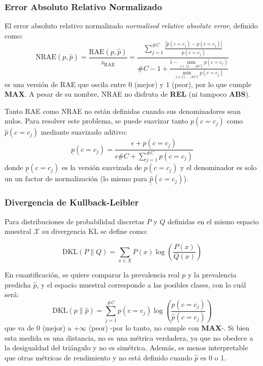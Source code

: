 \subsubsection{Error Absoluto Relativo Normalizado}\label{evaluacion:nrae}

El error absoluto relativo normalizado {\it normalised relative absolute error},
definido como:
\begin{equation}
    {\text{NRAE}(p, \hat p)} = \frac{\text{RAE}(p, \hat p)}{z_{\text{RAE}}} = \frac{\sum \limits_{j=1}^{\#C}{\frac{|\hat p(c=c_j) - p(c=c_j)|}{p(c=c_j)}}}{\#C - 1 + \frac {1 - \displaystyle \min_{j\in\{1,\dots,\#C\}}p(c=c_j)}{\displaystyle \min_{j\in\{1,\dots,\#C\}}p(c=c_j)}}\label{evaluacion:eq_nrae}
\end{equation}
es una versión de RAE que oscila entre 0 (mejor) y 1 (peor), por lo que cumple
{\bf MAX}. A pesar de su nombre, NRAE no disfruta de {\bf REL} (ni tampoco {\bf
ABS}).

Tanto RAE como NRAE no están definidas cuando sus denominadores sean nulos. Para
resolver este problema, se puede suavizar tanto $p(c=c_j)$ como $\hat p(c=c_j)$
mediante suavizado aditivo:
\begin{equation}
    \underline p(c=c_j) = \frac{\epsilon + p(c=c_j)}{\epsilon  \#C + \sum \limits_{j=1}^{\#C}{p(c=c_j)}}\label{evaluacion:eq_suav_rae_nrae}
\end{equation}
donde $\underline p(c=c_j)$ es la versión suavizada de $p(c=c_j)$ y el
denominador es solo un un factor de normalización (lo mismo para $\underline
{\hat p}(c=c_j)$).

\subsubsection{Divergencia de Kullback-Leibler}\label{evaluacion:dkl}

Para distribuciones de probabilidad discretas $P$ y $Q$ definidas en el mismo
espacio muestral ${\mathcal {X}}$ su divergencia KL se define como:

\begin{equation}
    {\text{DKL}}(P\parallel Q)=\sum \limits_{x\in {X}}P(x)\log \left({\frac {P(x)}{Q(x)}}\right)\label{evaluacion:eq_dkl}
\end{equation}

En cuantificación, se quiere comparar la prevalencia real $p$ y la prevalencia
predicha $\hat{p}$, y el espacio muestral corresponde a las posibles clases, con
lo cuál será:
\begin{equation}
    {\text{DKL}}(p\parallel \hat{p}) = \sum \limits_{j=1}^{\#C}p(c=c_j)\log \left({\frac {p(c=c_j)}{\hat p(c=c_j)}}\right)\label{evaluacion:eq_dkl2}
\end{equation}
que va de {0} (mejor) a {+$\infty$} (peor) -por lo tanto, no cumple con {\bf
MAX}-. Si bien esta medida es una distancia, no es una métrica verdadera, ya que
no obedece a la desigualdad del triángulo y no es simétrica. Además, es menos
interpretable que otras métricas de rendimiento y no está definido cuando
$\hat{p}$ es 0 o 1.

